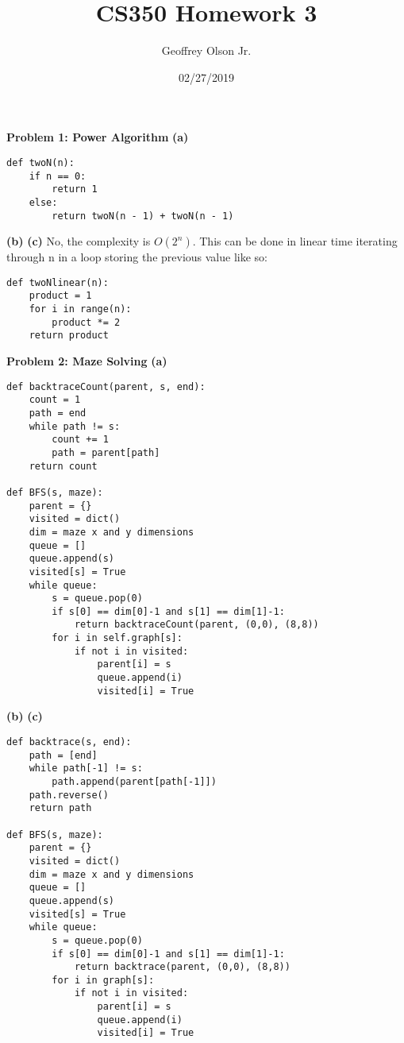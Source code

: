 \documentclass[12pt]{article}
\title{CS350 Homework 3}
\author{Geoffrey Olson Jr.}
\date{02/27/2019}
\begin{document}
\maketitle
\textbf{Problem 1: Power Algorithm}
\newline
\textbf{(a)}
\begin{lstlisting}
def twoN(n):
    if n == 0:
        return 1
    else:
        return twoN(n - 1) + twoN(n - 1)
\end{lstlisting}
\textbf{(b)}
\newline
\textbf{(c)}
No, the complexity is $O(2^n)$. This can be done in linear time iterating through n in a loop storing the previous value like so:
\begin{lstlisting}
def twoNlinear(n):
    product = 1
    for i in range(n):
        product *= 2
    return product
\end{lstlisting}
\textbf{Problem 2: Maze Solving}
\newline
\textbf{(a)}
\begin{lstlisting}
def backtraceCount(parent, s, end):
    count = 1
    path = end
    while path != s:
        count += 1
        path = parent[path]
    return count

def BFS(s, maze):
    parent = {}
    visited = dict()
    dim = maze x and y dimensions
    queue = []
    queue.append(s)
    visited[s] = True
    while queue:
        s = queue.pop(0)
        if s[0] == dim[0]-1 and s[1] == dim[1]-1:
            return backtraceCount(parent, (0,0), (8,8))
        for i in self.graph[s]:
            if not i in visited:
                parent[i] = s
                queue.append(i)
                visited[i] = True
\end{lstlisting}
\textbf{(b)}
\newline
\textbf{(c)}
\begin{lstlisting}
def backtrace(s, end):
    path = [end]
    while path[-1] != s:
        path.append(parent[path[-1]])
    path.reverse()
    return path

def BFS(s, maze):
    parent = {}
    visited = dict()
    dim = maze x and y dimensions
    queue = []
    queue.append(s)
    visited[s] = True
    while queue:
        s = queue.pop(0)
        if s[0] == dim[0]-1 and s[1] == dim[1]-1:
            return backtrace(parent, (0,0), (8,8))
        for i in graph[s]:
            if not i in visited:
                parent[i] = s
                queue.append(i)
                visited[i] = True
\end{lstlisting}
\end{document}
